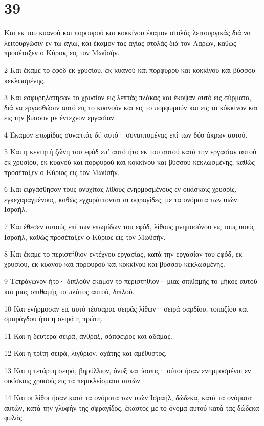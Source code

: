 \chapter{39}

\par Και εκ του κυανού και πορφυρού και κοκκίνου έκαμον στολάς λειτουργικάς διά να λειτουργώσιν εν τω αγίω, και έκαμον τας αγίας στολάς διά τον Ααρών, καθώς προσέταξεν ο Κύριος εις τον Μωϋσήν.
\par 2 Και έκαμε το εφόδ εκ χρυσίου, εκ κυανού και πορφυρού και κοκκίνου και βύσσου κεκλωσμένης.
\par 3 Και εσφυρηλάτησαν το χρυσίον εις λεπτάς πλάκας και έκοψαν αυτό εις σύρματα, διά να εργασθώσιν αυτό εις το κυανούν και εις το πορφυρούν και εις το κόκκινον και εις την βύσσον με έντεχνον εργασίαν.
\par 4 Έκαμον επωμίδας συναπτάς δι' αυτό· συναπτομένας επί των δύο άκρων αυτού.
\par 5 Και η κεντητή ζώνη του εφόδ επ' αυτό ήτο εκ του αυτού κατά την εργασίαν αυτού· εκ χρυσίου, εκ κυανού και πορφυρού και κοκκίνου και βύσσου κεκλωσμένης, καθώς προσέταξεν ο Κύριος εις τον Μωϋσήν.
\par 6 Και ειργάσθησαν τους ονυχίτας λίθους ενηρμοσμένους εν οικίσκοις χρυσοίς, εγκεχαραγμένους, καθώς εγχαράττονται αι σφραγίδες, με τα ονόματα των υιών Ισραήλ.
\par 7 Και έθεσεν αυτούς επί των επωμίδων του εφόδ, λίθους μνημοσύνου εις τους υιούς Ισραήλ, καθώς προσέταξεν ο Κύριος εις τον Μωϋσήν.
\par 8 Και έκαμε το περιστήθιον εντέχνου εργασίας, κατά την εργασίαν του εφόδ, εκ χρυσίου, εκ κυανού και πορφυρού και κοκκίνου και βύσσου κεκλωσμένης.
\par 9 Τετράγωνον ήτο· διπλούν έκαμον το περιστήθιον· μιας σπιθαμής το μήκος αυτού και μιας σπιθαμής το πλάτος αυτού, διπλού.
\par 10 Και ενήρμοσαν εις αυτό τέσσαρας σειράς λίθων· σειρά σαρδίου, τοπαζίου και σμαράγδου ήτο η σειρά η πρώτη.
\par 11 Και η δευτέρα σειρά, άνθραξ, σάπφειρος και αδάμας.
\par 12 Και η τρίτη σειρά, λιγύριον, αχάτης και αμέθυστος.
\par 13 Και η τετάρτη σειρά, βηρύλλιον, όνυξ και ίασπις· ούτοι ήσαν ενηρμοσμένοι εν οικίσκοις χρυσοίς εις τα περικλείσματα αυτών.
\par 14 Και οι λίθοι ήσαν κατά τα ονόματα των υιών Ισραήλ, δώδεκα, κατά τα ονόματα αυτών, κατά την γλυφήν της σφραγίδος, έκαστος με το όνομα αυτού κατά τας δώδεκα φυλάς.
